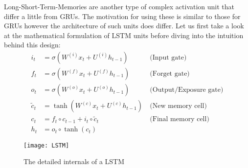 \documentclass{tufte-handout}
\begin{document}
Long-Short-Term-Memories are another type of complex activation unit that differ a little from GRUs. The motivation for using these is similar to those for GRUs however the architecture of such units does differ. Let us first take a look at the mathematical formulation of LSTM units before diving into the intuition behind this design:
\begin{align*}
i_{t} &= \sigma(W^{(i)}x_{t} + U^{(i)}h_{t-1})&~\text{(Input gate)}\\
f_{t} &= \sigma(W^{(f)}x_{t} + U^{(f)}h_{t-1})&~\text{(Forget gate)}\\
o_{t} &= \sigma(W^{(o)}x_{t} + U^{(o)}h_{t-1})&~\text{(Output/Exposure gate)}\\
\tilde{c}_{t} &= \operatorname{tanh}(W^{(c)}x_{t} + U^{(c)}h_{t-1})&~\text{(New memory cell)}\\
c_{t} &= f_{t} \circ c_{t-1} + i_{t} \circ \tilde{c}_{t}&~\text{(Final memory cell)}\\
h_{t} &= o_{t} \circ \operatorname{tanh}(c_{t})
\end{align*}

\begin{figure*}%
  \texttt{[image: LSTM]}
  \caption{The detailed internals of a LSTM}
  \label{fig:LSTM}
\end{figure*}
\end{document}

